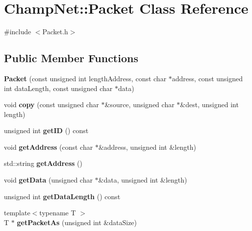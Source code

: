 \hypertarget{class_champ_net_1_1_packet}{\section{Champ\-Net\-:\-:Packet Class Reference}
\label{class_champ_net_1_1_packet}
}


{\ttfamily \#include $<$Packet.\-h$>$}

\subsection*{Public Member Functions}
\begin{DoxyCompactItemize}
\item 
\hypertarget{class_champ_net_1_1_packet_aff76d883fd5533bda3210d11c6d3ca2e}{{\bfseries Packet} (const unsigned int length\-Address, const char $\ast$address, const unsigned int data\-Length, const unsigned char $\ast$data)}\label{class_champ_net_1_1_packet_aff76d883fd5533bda3210d11c6d3ca2e}

\item 
\hypertarget{class_champ_net_1_1_packet_a068e85d829e9fa4b980ec115b40048d3}{void {\bfseries copy} (const unsigned char $\ast$\&source, unsigned char $\ast$\&dest, unsigned int length)}\label{class_champ_net_1_1_packet_a068e85d829e9fa4b980ec115b40048d3}

\item 
\hypertarget{class_champ_net_1_1_packet_abe3a5de756c64e6890dcf4b0a95a2db7}{unsigned int {\bfseries get\-I\-D} () const }\label{class_champ_net_1_1_packet_abe3a5de756c64e6890dcf4b0a95a2db7}

\item 
\hypertarget{class_champ_net_1_1_packet_a8ab4d17481d7fc08f3c0dc2c48eb9a0a}{void {\bfseries get\-Address} (const char $\ast$\&address, unsigned int \&length)}\label{class_champ_net_1_1_packet_a8ab4d17481d7fc08f3c0dc2c48eb9a0a}

\item 
\hypertarget{class_champ_net_1_1_packet_a98b70a972a4a956e94f7203bc2f77402}{std\-::string {\bfseries get\-Address} ()}\label{class_champ_net_1_1_packet_a98b70a972a4a956e94f7203bc2f77402}

\item 
\hypertarget{class_champ_net_1_1_packet_a01e9211c5d6a0080d035ddf969a4efa5}{void {\bfseries get\-Data} (unsigned char $\ast$\&data, unsigned int \&length)}\label{class_champ_net_1_1_packet_a01e9211c5d6a0080d035ddf969a4efa5}

\item 
\hypertarget{class_champ_net_1_1_packet_a0a8b68fc76f6bfe512244acfef247627}{unsigned int {\bfseries get\-Data\-Length} () const }\label{class_champ_net_1_1_packet_a0a8b68fc76f6bfe512244acfef247627}

\item 
\hypertarget{class_champ_net_1_1_packet_ad336c6b2ff59a0dff1bf7d70f1da9340}{{\footnotesize template$<$typename T $>$ }\\T $\ast$ {\bfseries get\-Packet\-As} (unsigned int \&data\-Size)}\label{class_champ_net_1_1_packet_ad336c6b2ff59a0dff1bf7d70f1da9340}

\end{DoxyCompactItemize}
